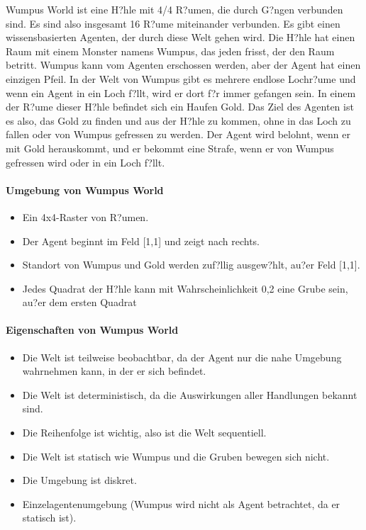 Wumpus World ist eine H?hle mit 4/4 R?umen, die durch G?ngen verbunden sind. Es sind also insgesamt 16 R?ume miteinander verbunden. Es gibt einen wissensbasierten Agenten, der durch diese Welt gehen wird. Die H?hle hat einen Raum mit einem Monster namens Wumpus, das jeden frisst, der den Raum betritt. Wumpus kann vom Agenten erschossen werden, aber der Agent hat einen einzigen Pfeil. In der Welt von Wumpus gibt es mehrere endlose Lochr?ume und wenn ein Agent in ein Loch f?llt, wird er dort f?r immer gefangen sein. In einem der R?ume dieser H?hle befindet sich ein Haufen Gold. Das Ziel des Agenten ist es also, das Gold zu finden und aus der H?hle zu kommen, ohne in das Loch zu fallen oder von Wumpus gefressen zu werden. Der Agent wird belohnt, wenn er mit Gold herauskommt, und er bekommt eine Strafe, wenn er von Wumpus gefressen wird oder in ein Loch f?llt.

\paragraph{Umgebung von Wumpus World}
\begin{itemize}
    \item Ein 4x4-Raster von R?umen.
    \item Der Agent beginnt im Feld [1,1] und zeigt nach rechts.
    \item Standort von Wumpus und Gold werden zuf?llig ausgew?hlt, au?er Feld [1,1].
    \item Jedes Quadrat der H?hle kann mit Wahrscheinlichkeit 0,2 eine Grube sein, au?er dem ersten Quadrat
\end{itemize}

\paragraph{Eigenschaften von Wumpus World}
\begin{itemize}
    \item Die Welt ist teilweise beobachtbar, da der Agent nur die nahe Umgebung wahrnehmen kann, in der er sich befindet.
    \item Die Welt ist deterministisch, da die Auswirkungen aller Handlungen bekannt sind.
    \item Die Reihenfolge ist wichtig, also ist die Welt sequentiell.
    \item Die Welt ist statisch wie Wumpus und die Gruben bewegen sich nicht.
    \item Die Umgebung ist diskret.
    \item Einzelagentenumgebung (Wumpus wird nicht als Agent betrachtet, da er statisch ist).
\end{itemize}

